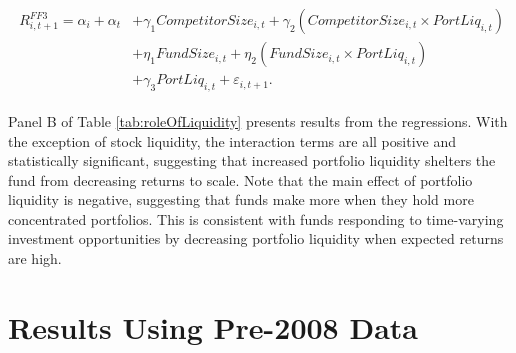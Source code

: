 \documentclass[openany]{book}
\theoremstyle{definition}
\theoremstyle{definition}
\theoremstyle{definition}
\theoremstyle{remark}
\begin{document}
\begin{align}
\begin{split}
R^{FF3}_{i,t+1} = \alpha_i + \alpha_t &+ \gamma_1 CompetitorSize_{i,t} + \gamma_2 \left( CompetitorSize_{i,t} \times PortLiq_{i,t} \right) \\ 
&+ \eta_1 FundSize_{i,t} + \eta_2 \left( FundSize_{i,t} \times PortLiq_{i,t} \right)  \\
&+\gamma_3 PortLiq_{i,t} + \varepsilon_{i,t+1}.
\end{split}
\end{align}

Panel B of Table \ref{tab:roleOfLiquidity} presents results from the
regressions. With the exception of stock liquidity, the interaction
terms are all positive and statistically significant, suggesting that
increased portfolio liquidity shelters the fund from decreasing returns
to scale. Note that the main effect of portfolio liquidity is negative,
suggesting that funds make more when they hold more concentrated
portfolios. This is consistent with funds responding to time-varying
investment opportunities by decreasing portfolio liquidity when expected
returns are high.

\section{Results Using Pre-2008 Data}\label{results-using-pre-2008-data}
\end{document}
